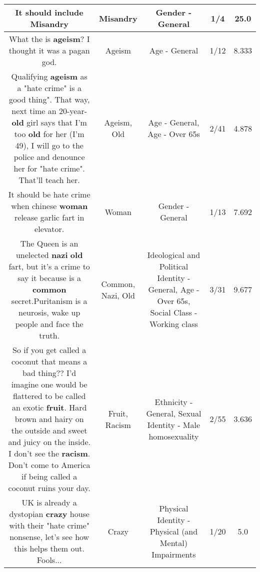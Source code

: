 \documentclass[11pt]{article}
\newlength\mylength
\begin{document}
\begin{center}
\begin{longtable}{|C{.65\mylength}|C{.30\mylength}|C{.12\mylength}|C{.12\mylength}|C{.12\mylength}|}
  \small It should include Misandry\normalsize   & Misandry & Gender - General & 1/4 & 25.0 \\  \hline
  \small What the \@ is \textbf{ageism}?  I thought it was a pagan god.\normalsize   & Ageism & Age - General & 1/12 & 8.333 \\  \hline
  \small Qualifying \textbf{ageism} as a "hate crime" is a good thing". That way, next time an 20-year-\textbf{old} girl says that I'm too \textbf{old} for her (I'm 49), I will go to the police and denounce her for "hate crime". That'll teach her.\normalsize   & Ageism, Old & Age - General, Age - Over 65s & 2/41 & 4.878 \\  \hline
  \small It should be hate crime when chinese \textbf{woman} release garlic fart in elevator.\normalsize   & Woman & Gender - General & 1/13 & 7.692 \\  \hline
  \small The Queen is an unelected \textbf{nazi} \textbf{old} fart, but it's a crime to say it because is a \textbf{common} secret.Puritanism is a neurosis, wake up people and face the truth.\normalsize   & Common, Nazi, Old &  Ideological and Political Identity - General, Age - Over 65s, Social Class - Working class & 3/31 & 9.677 \\  \hline
  \small So if you get called a coconut that means a bad thing?? I'd imagine one would be flattered to be called an exotic \textbf{fruit}. Hard brown and hairy on the outside and sweet and juicy on the inside. I don't see the \textbf{racism}. Don't come to America if being called a coconut ruins your day.\normalsize   & Fruit, Racism & Ethnicity - General, Sexual Identity - Male homosexuality & 2/55 & 3.636 \\  \hline
  \small UK is already a dystopian \textbf{crazy} house with their "hate crime" nonsense, let's see how this helps them out. Fools...\normalsize   & Crazy & Physical Identity - Physical (and Mental) Impairments & 1/20 & 5.0 \\  \hline

\end{longtable}
\end{center}
\end{document}
